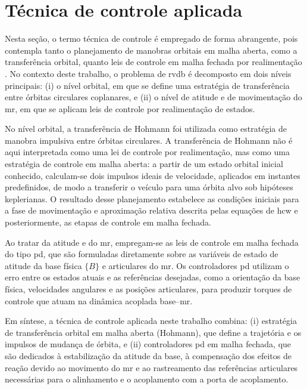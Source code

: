 \section{Técnica de controle aplicada}
\label{sec:tecnica_pd}

Nesta seção, o termo técnica de controle é empregado de forma abrangente, pois contempla tanto o planejamento de manobras orbitais em malha aberta, como a transferência orbital, quanto leis de controle em malha fechada por realimentação \cite{astrom1995pid}.
No contexto deste trabalho, o problema de \gls{rvdb} é decomposto em dois níveis principais:
(i) o nível orbital, em que se define uma estratégia de transferência entre órbitas circulares coplanares, e
(ii) o nível de atitude e de movimentação do \gls{mr}, em que se aplicam leis de controle por realimentação de estados.

No nível orbital, a transferência de Hohmann foi utilizada como estratégia de manobra impulsiva entre órbitas circulares.
A transferência de Hohmann não é aqui interpretada como uma lei de controle por realimentação, mas como uma estratégia de controle em malha aberta: a partir de um estado orbital inicial conhecido, calculam-se dois impulsos ideais de velocidade, aplicados em instantes predefinidos, de modo a transferir o veículo para uma órbita alvo sob hipóteses keplerianas.
O resultado desse planejamento estabelece as condições iniciais para a fase de movimentação e aproximação relativa descrita pelas equações de \gls{hcw} e posteriormente, as etapas de controle em malha fechada.

Ao tratar da atitude e do \gls{mr}, empregam-se as leis de controle em malha fechada do tipo \gls{pd}, que são formuladas diretamente sobre as variáveis de estado de atitude da base física $\{B\}$ e articulares do \gls{mr}.
Os controladores \gls{pd} utilizam o erro entre os estados atuais e as referências desejadas, como a orientação da base física, velocidades angulares e as posições articulares, para produzir torques de controle que atuam na dinâmica acoplada base--\gls{mr}.

Em síntese, a técnica de controle aplicada neste trabalho combina:
(i) estratégia de transferência orbital em malha aberta (Hohmann), que define a trajetória e os impulsos de mudança de órbita, e
(ii) controladores \gls{pd} em malha fechada, que são dedicados à estabilização da atitude da base, à compensação dos efeitos de reação devido ao movimento do \gls{mr} e ao rastreamento das referências articulares necessárias para o alinhamento e o acoplamento com a porta de acoplamento.

